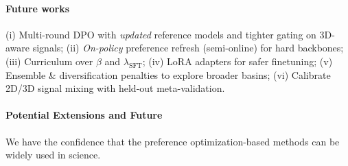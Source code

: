 \paragraph{Future works}
(i) Multi-round DPO with \emph{updated} reference models and tighter gating on 3D-aware signals; 
(ii) \emph{On-policy} preference refresh (semi-online) for hard backbones; 
(iii) Curriculum over $\beta$ and $\lambda_{\mathrm{SFT}}$; 
(iv) LoRA adapters for safer finetuning; 
(v) Ensemble \& diversification penalties to explore broader basins; 
(vi) Calibrate 2D/3D signal mixing with held-out meta-validation.




\paragraph{Potential Extensions and Future}
We have the confidence that the preference optimization-based methods can be widely used in science. 






